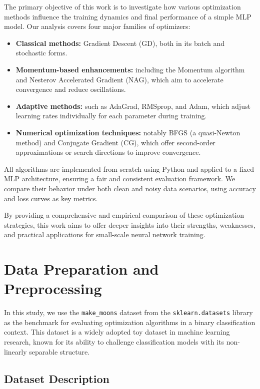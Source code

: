 \documentclass[12pt]{article}
\begin{document}
The primary objective of this work is to investigate how various optimization methods influence the training dynamics and final performance of a simple MLP model. Our analysis covers four major families of optimizers:

\begin{itemize}
    \item \textbf{Classical methods:} Gradient Descent (GD), both in its batch and stochastic forms.
    \item \textbf{Momentum-based enhancements:} including the Momentum algorithm and Nesterov Accelerated Gradient (NAG), which aim to accelerate convergence and reduce oscillations.
    \item \textbf{Adaptive methods:} such as AdaGrad, RMSprop, and Adam, which adjust learning rates individually for each parameter during training.
    \item \textbf{Numerical optimization techniques:} notably BFGS (a quasi-Newton method) and Conjugate Gradient (CG), which offer second-order approximations or search directions to improve convergence.
\end{itemize}

All algorithms are implemented from scratch using Python and applied to a fixed MLP architecture, ensuring a fair and consistent evaluation framework. We compare their behavior under both clean and noisy data scenarios, using accuracy and loss curves as key metrics.

By providing a comprehensive and empirical comparison of these optimization strategies, this work aims to offer deeper insights into their strengths, weaknesses, and practical applications for small-scale neural network training.

\section{Data Preparation and Preprocessing}

In this study, we use the \texttt{make\_moons} dataset from the \texttt{sklearn.datasets} library as the benchmark for evaluating optimization algorithms in a binary classification context. This dataset is a widely adopted toy dataset in machine learning research, known for its ability to challenge classification models with its non-linearly separable structure.

\subsection{Dataset Description}
\end{document}
